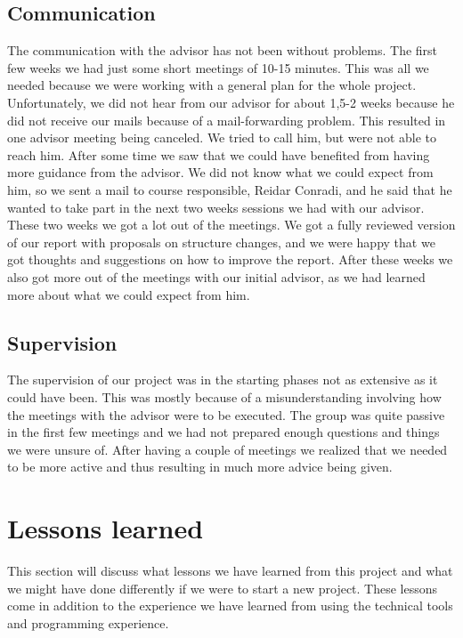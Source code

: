 \subsection{Communication}
The communication with the advisor has not been without problems. The first few weeks we had just some short meetings of 10-15 minutes. This was all we needed because we were working with a general plan for the whole project.
\newline
\newline
Unfortunately, we did not hear from our advisor for about 1,5-2 weeks because he did not receive our mails because of a mail-forwarding problem. This resulted in one advisor meeting being canceled. We tried to call him, but were not able to reach him.
\newline
\newline
After some time we saw that we could have benefited from having more guidance from the advisor. We did not know what we could expect from him, so we sent a mail to course responsible, Reidar Conradi, and he said that he wanted to take part in the next two weeks sessions we had with our advisor.
\newline
\newline
These two weeks we got a lot out of the meetings. We got a fully reviewed version of our report with proposals on structure changes, and we were happy that we got thoughts and suggestions on how to improve the report. After these weeks we also got more out of the meetings with our initial advisor, as we had learned more about what we could expect from him.

\subsection{Supervision}
The supervision of our project was in the starting phases not as extensive as it could have been. This was mostly because of a misunderstanding involving how the meetings with the advisor were to be executed. The group was quite passive in the first few meetings and we had not prepared enough questions and things we were unsure of. After having a couple of meetings we realized that we needed to be more active and thus resulting in much more advice being given.

\newpage

\section{Lessons learned}\label{sec:refl_lessons}
This section will discuss what lessons we have learned from this project and what we might have done differently if we were to start a new project. These lessons come in addition to the experience we have learned from using the technical tools and programming experience.

